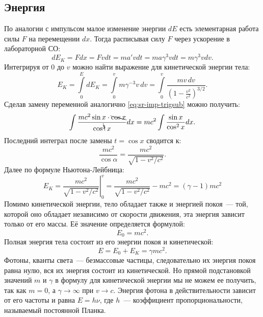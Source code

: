 \subsection{Энергия}
По аналогии с импульсом малое изменение энергии $dE$ есть элементарная работа силы $F$ на перемещении $dx$. Тогда расписывая силу $F$ через ускорение в лабораторной СО:
\begin{equation*}
	dE_K = F dx = F v dt = m a' v dt = m a \gamma^{3} v dt = m \gamma^{3} v dv.
\end{equation*}
Интегрируя от 0 до $v$ можно найти выражение для кинетической энергии тела:
\begin{equation*}
	E_K = \int\limits_0^{E} dE_K = \int\limits_0^{v} m \gamma^{-3}v \,dv= \int\limits_0^{v} \frac{m v \, dv}{\left(1 - \frac{v^2}{c^2}\right)^{3/2}}.
\end{equation*}
Сделав замену переменной аналогично \eqref{eq:sr-imp-trigsub} можно получить:
\begin{equation*}
	\int \frac{m c^2 \sin x \cdot \bcancel{\cos x}}{\cos ^{\bcancel{3}} x} d x=m c^2 \int \frac{\sin x}{\cos ^2 x} d x.
\end{equation*}
Последний интеграл после замены $t = \cos x$ сводится к:
\begin{equation*}
	\frac{m c^2}{\cos \alpha}=\frac{m c^2}{\sqrt{1-v^2 / c^2}}.
\end{equation*}
Далее по формуле Ньютона-Лейбница:
\begin{equation}
E_K=\left.\frac{m c^2}{\sqrt{1-v^2 / c^2}}\right|_0 ^v=\frac{m c^2}{\sqrt{1-v^2 / c^2}}-m c^2=(\gamma-1) m c^2
\end{equation}
Помимо кинетической энергии, тело обладает также и энергией покоя~--- той, которой оно обладает независимо от скорости движения, эта энергия зависит только от его массы. Её значение определяется формулой:
\begin{equation}
	E_0 = m c^2.
\end{equation}
Полная энергия тела состоит из его энергии покоя и кинетической:
\begin{equation}
	E=E_0+E_K=\gamma m c^2.
\end{equation}
Фотоны, кванты света~--- безмассовые частицы, следовательно их энергия покоя равна нулю, вся их энергия состоит из кинетической. Но прямой подстановкой значений $m$ и $\gamma$ в формулу для кинетической энергии мы не можем ее получить, так как $m=0$, а $\gamma \rightarrow \infty$ при $v \rightarrow c$. Энергия фотона в действительности зависит от его частоты и равна $E=h \nu$, где $h$~--- коэффициент пропорциональности, называемый постоянной Планка.